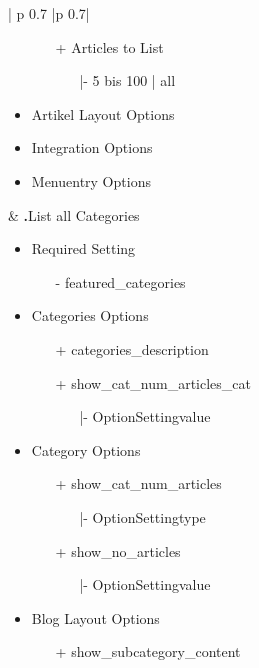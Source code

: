 \begin{minipage}{0.7\textwidth}
\begin{longtable}{| p {0.7\textwidth} |p {0.7\textwidth}|}
\begin{itemize}
\begin{enumerate}
   	\item[+] Articles to List
   			\begin{enumerate}
   				\item[|-] 5 bis 100 | all
   			\end{enumerate}
   	\end{enumerate}
   	\item Artikel Layout Options
   	\item Integration Options
   	\item Menuentry Options
 \end{itemize}
&
\textbf{.}List all Categories
	 \begin{itemize}
       \item Required  Setting 
      		\begin{enumerate}
      			\item[-] featured\_categories
      		\end{enumerate}
      	\item Categories Options
      		\begin{enumerate}
      		    \item[+] categories\_description
      		    \item[+] show\_cat\_num\_articles\_cat 
      		    	  \begin{enumerate}
      		    			 \item[|-] OptionSettingvalue
      		    	\end{enumerate}
      		   \end{enumerate}
   	   	\item Category Options
   	   		\begin{enumerate}
   	   	   	\item[+] show\_cat\_num\_articles
   	   	   		\begin{enumerate}
   	   	   			\item[|-] OptionSettingtype
   	   	   		\end{enumerate} 
   	   	   	\item[+] show\_no\_articles
   	   	   		\begin{enumerate}
   	   	   			\item[|-] OptionSettingvalue
   	   	   		\end{enumerate}
   	   	   	\end{enumerate}
   	   	\item Blog Layout Options
   	   		\begin{enumerate}
   	   	   	   			\item[+] show\_subcategory\_content

\end{enumerate}
\end{itemize}
\end{longtable}
\end{minipage}
